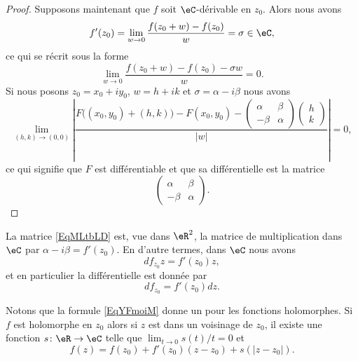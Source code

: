 \begin{proof}
    Supposons maintenant que \( f\) soit $\eC$-dérivable en \( z_0\). Alors nous avons
    \begin{equation}
        f'(z_0)=\lim_{w\to 0} \frac{ f(z_0+w)-f(z_0) }{ w }=\sigma\in \eC,
    \end{equation}
    ce qui se récrit sous la forme
    \begin{equation}
        \lim_{w\to 0} \frac{ f(z_0+w)-f(z_0)-\sigma w }{ w }=0.
    \end{equation}
    Si nous posons \( z_0=x_0+iy_0\), \( w=h+ik\) et \( \sigma=\alpha-i\beta\) nous avons
    \begin{equation}
        \lim_{(h,k)\to (0,0)} \left| \frac{ F\big( (x_0,y_0)+(h,k) \big)-F(x_0,y_0)-\begin{pmatrix}
            \alpha    &   \beta    \\ 
            -\beta    &   \alpha    
        \end{pmatrix}\begin{pmatrix}
            h    \\ 
            k    
        \end{pmatrix}}{ | w | } \right| =0,
    \end{equation}
    ce qui signifie que \( F\) est différentiable et que sa différentielle est la matrice
    \begin{equation}    \label{EqMLtbLD}
       \begin{pmatrix}
           \alpha &   \beta    \\ 
           -\beta &   \alpha    
       \end{pmatrix}.
    \end{equation}
\end{proof}

La matrice \eqref{EqMLtbLD} est, vue dans \( \eR^2\), la matrice de multiplication dans \( \eC\) par \( \alpha-i\beta=f'(z_0)\). En d'autre termes, dans \( \eC\) nous avons
\begin{equation}
    df_{z_0}z=f'(z_0)z,
\end{equation}
et en particulier la différentielle est donnée par
\begin{equation}        \label{EqPropZOkfmO}
    df_{z_0}=f'(z_0)dz.
\end{equation}

Notons que la formule \eqref{EqYFmoiM} donne un  pour les fonctions holomorphes. Si \( f\) est holomorphe en \( z_0\) alors si \( z\) est dans un voisinage de \( z_0\), il existe une fonction \( s\colon \eR\to \eC\) telle que \( \lim_{t\to 0} s(t)/t=0\) et 
\begin{equation}    \label{EqptwBFG}
    f(z)=f(z_0)+f'(z_0)(z-z_0)+s(| z-z_0 |).
\end{equation}

